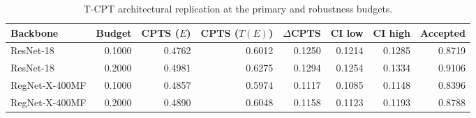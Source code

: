 \begin{table}[t]
\centering
\caption{T-CPT architectural replication at the primary and robustness budgets.}
\label{tab:tcpt_backbones}
\begin{tabular}{lrrrrrrr}
\toprule
Backbone & Budget & CPTS ($E$) & CPTS ($T(E)$) & $\Delta$CPTS & CI low & CI high & Accepted \\
\midrule
ResNet-18 & 0.1000 & 0.4762 & 0.6012 & 0.1250 & 0.1214 & 0.1285 & 0.8719 \\
ResNet-18 & 0.2000 & 0.4981 & 0.6275 & 0.1294 & 0.1254 & 0.1334 & 0.9106 \\
RegNet-X-400MF & 0.1000 & 0.4857 & 0.5974 & 0.1117 & 0.1085 & 0.1148 & 0.8396 \\
RegNet-X-400MF & 0.2000 & 0.4890 & 0.6048 & 0.1158 & 0.1123 & 0.1193 & 0.8788 \\
\bottomrule
\end{tabular}
\end{table}
